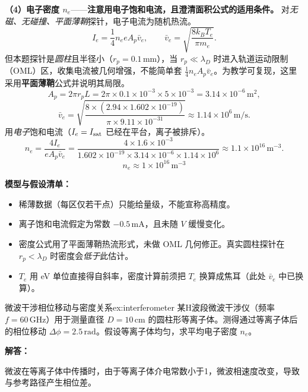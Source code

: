 \textbf{（4）电子密度 $n_e$}——\textbf{注意用电子饱和电流，且澄清面积公式的适用条件。} 对\emph{无磁、无碰撞、平面薄鞘}探针，电子电流为随机热流。
\begin{equation}
    I_e = \frac{1}{4} n_e e A_p \bar v_e,\qquad \bar v_e = \sqrt{\frac{8k_BT_e}{\pi m_e}}.
\end{equation}
但本题探针是\emph{圆柱}且半径小（$r_p=0.1\,\mathrm{mm}$），当 $r_p \ll \lambda_D$ 时进入轨道运动限制（OML）区，收集电流被几何增强，不能简单套 $\frac14 n_eA_p\bar v_e$。为教学可复现，这里采用\textbf{平面薄鞘}公式并说明其局限。
\[
    A_p = 2\pi r_p L = 2\pi\times0.1\times10^{-3}\times5\times10^{-3} = 3.14\times10^{-6}\,\mathrm{m^2},
\]
\[
    \bar v_e = \sqrt{\frac{8\times(2.94\times1.602\times10^{-19})}{\pi\times9.11\times10^{-31}}}
    \approx 1.14\times10^{6}\,\mathrm{m/s}.
\]
用\emph{电子}饱和电流（$I_e = I_{\rm sat}$ 已经在平台，离子被排斥）。
\begin{equation}
    n_e = \frac{4 I_e}{eA_p\bar v_e}
    = \frac{4\times1.6\times10^{-3}}{1.602\times10^{-19}\times3.14\times10^{-6}\times1.14\times10^{6}}
    \approx 1.1\times10^{16}\,\mathrm{m^{-3}}.
\end{equation}
\[
    \boxed{n_e \approx 1\times10^{16}\,\mathrm{m^{-3}}}
\]

\textbf{模型与假设清单：}
\begin{itemize}
    \item 稀薄数据（每区仅若干点）只能给量级，不能宣称高精度。
    \item 离子饱和电流假定为常数 $-0.5\,\mathrm{mA}$，且未随 $V$ 缓慢变化。
    \item 密度公式用了平面薄鞘热流形式，未做 OML 几何修正。真实圆柱探针在 $r_p<\lambda_D$ 时密度会\emph{低于}此估计。
    \item $T_e$ 用 eV 单位直接得自斜率，密度计算前须把 $T_e$ 换算成焦耳（此处 $\bar v_e$ 中已换算）。
\end{itemize}



\begin{example}{微波干涉相位移动与密度关系}{ex:interferometer}
某H波段微波干涉仪（频率 $f=60\,\mathrm{GHz}$）用于测量直径 $D=10\,\mathrm{cm}$ 的圆柱形等离子体。测得通过等离子体后的相位移动 $\Delta\phi = 2.5\,\mathrm{rad}$。假设等离子体均匀，求平均电子密度 $n_e$。
\end{example}

\textbf{解答：}

微波在等离子体中传播时，由于等离子体介电常数小于1，微波相速度改变，导致与参考路径产生相位差。

